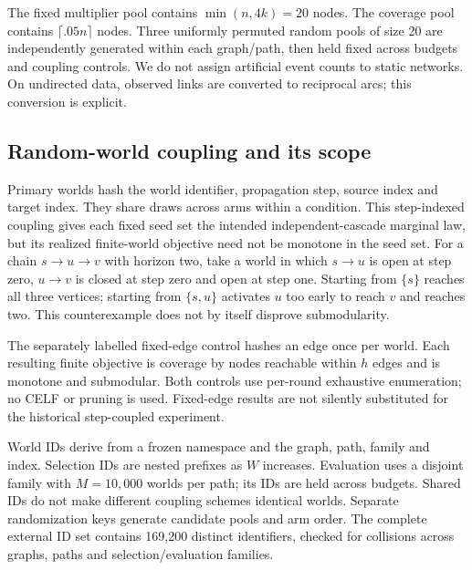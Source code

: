\documentclass[smallextended]{svjour3}
\begin{document}
The fixed multiplier pool contains $\min(n,4k)=20$ nodes. The coverage pool contains $\lceil .05n\rceil$ nodes. Three uniformly permuted random pools of size 20 are independently generated within each graph/path, then held fixed across budgets and coupling controls. We do not assign artificial event counts to static networks. On undirected data, observed links are converted to reciprocal arcs; this conversion is explicit.

\subsection{Random-world coupling and its scope}\label{sec:coupling}
Primary worlds hash the world identifier, propagation step, source index and target index. They share draws across arms within a condition. This step-indexed coupling gives each fixed seed set the intended independent-cascade marginal law, but its realized finite-world objective need not be monotone in the seed set. For a chain $s\to u\to v$ with horizon two, take a world in which $s\to u$ is open at step zero, $u\to v$ is closed at step zero and open at step one. Starting from $\{s\}$ reaches all three vertices; starting from $\{s,u\}$ activates $u$ too early to reach $v$ and reaches two. This counterexample does not by itself disprove submodularity.

The separately labelled fixed-edge control hashes an edge once per world. Each resulting finite objective is coverage by nodes reachable within $h$ edges and is monotone and submodular. Both controls use per-round exhaustive enumeration; no CELF or pruning is used. Fixed-edge results are not silently substituted for the historical step-coupled experiment.

World IDs derive from a frozen namespace and the graph, path, family and index. Selection IDs are nested prefixes as $W$ increases. Evaluation uses a disjoint family with $M=10,000$ worlds per path; its IDs are held across budgets. Shared IDs do not make different coupling schemes identical worlds. Separate randomization keys generate candidate pools and arm order. The complete external ID set contains 169,200 distinct identifiers, checked for collisions across graphs, paths and selection/evaluation families.
\end{document}
